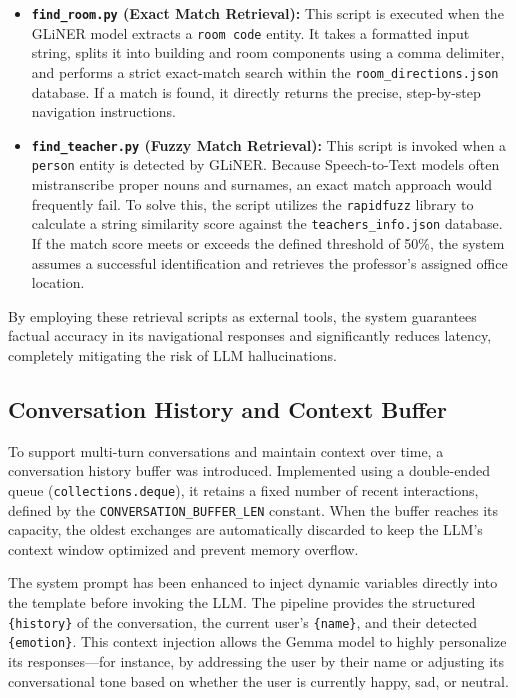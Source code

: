 \documentclass{article}
\begin{document}
	\begin{itemize}
		\item \textbf{\texttt{find\_room.py} (Exact Match Retrieval):} This script is executed when the GLiNER model extracts a \texttt{room code} entity. It takes a formatted input string, splits it into building and room components using a comma delimiter, and performs a strict exact-match search within the \texttt{room\_directions.json} database. If a match is found, it directly returns the precise, step-by-step navigation instructions.
		
		\item \textbf{\texttt{find\_teacher.py} (Fuzzy Match Retrieval):} This script is invoked when a \texttt{person} entity is detected by GLiNER. Because Speech-to-Text models often mistranscribe proper nouns and surnames, an exact match approach would frequently fail. To solve this, the script utilizes the \texttt{rapidfuzz} library to calculate a string similarity score against the \texttt{teachers\_info.json} database. If the match score meets or exceeds the defined threshold of 50\%, the system assumes a successful identification and retrieves the professor's assigned office location.
	\end{itemize}
	
	By employing these retrieval scripts as external tools, the system guarantees factual accuracy in its navigational responses and significantly reduces latency, completely mitigating the risk of LLM hallucinations.
	
	\subsection{Conversation History and Context Buffer}
	To support multi-turn conversations and maintain context over time, a conversation history buffer was introduced. Implemented using a double-ended queue (\texttt{collections.deque}), it retains a fixed number of recent interactions, defined by the \texttt{CONVERSATION\_BUFFER\_LEN} constant. When the buffer reaches its capacity, the oldest exchanges are automatically discarded to keep the LLM's context window optimized and prevent memory overflow.
	
	The system prompt has been enhanced to inject dynamic variables directly into the template before invoking the LLM. The pipeline provides the structured \texttt{\{history\}} of the conversation, the current user's \texttt{\{name\}}, and their detected \texttt{\{emotion\}}. This context injection allows the Gemma model to highly personalize its responses—for instance, by addressing the user by their name or adjusting its conversational tone based on whether the user is currently happy, sad, or neutral.
	
\end{document}
